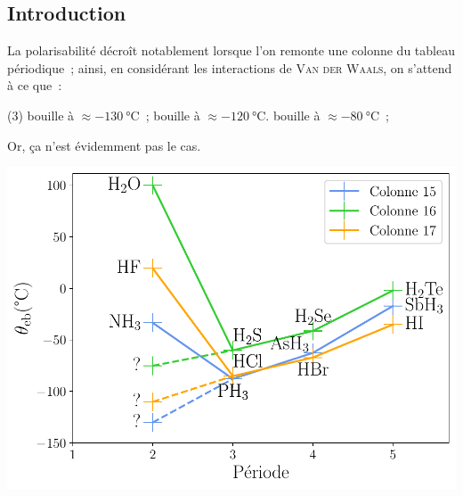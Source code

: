 \documentclass[../../main/main.tex]{subfiles}
\begin{document}
\subsection{Introduction}
La polarisabilité décroît notablement lorsque l'on remonte une colonne du
tableau périodique~; ainsi, en considérant les interactions de \textsc{Van der
	Waals}, on s'attend à ce que~:
\begin{tasks}(3)
	\task {} bouille à $\approx \SI{-130}{\degreeCelsius}$~;
	\task {} bouille à $\approx \SI{-120}{\degreeCelsius}$.
	\task {} bouille à $\approx \SI{-80}{\degreeCelsius}$~;
\end{tasks}
Or, ça n'est évidemment pas le cas.

\noindent
\begin{minipage}[t]{0.45\linewidth}
	\vspace{0pt}
	\begin{center}
		\includegraphics[width=\linewidth]{LH}
	\end{center}
\end{minipage}
\hfill
\end{document}

